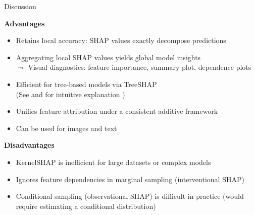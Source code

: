 \documentclass[10pt,compress,t,notes=noshow, xcolor=table]{beamer}
\begin{document}
\begin{frame}{Discussion}

\textbf{Advantages}

\begin{itemize}
    \item Retains local accuracy: SHAP values exactly decompose predictions
    \item Aggregating local SHAP values yields global model insights\\
    $\leadsto$ Visual diagnostics: feature importance, summary plot, dependence plots
    \item Efficient for tree-based models via TreeSHAP\\
    (See  and for intuitive explanation )
    \item Unifies feature attribution under a consistent additive framework
    
    \item Can be used for images   and text 
\end{itemize}

\medskip

\textbf{Disadvantages}

\begin{itemize}
  \item KernelSHAP is inefficient for large datasets or complex models
   \item Ignores feature dependencies in marginal sampling (interventional SHAP)
   \item Conditional sampling (observational SHAP) is difficult in practice (would require estimating a conditional distribution)
 
\end{itemize}


\end{frame}

\endlecture
\end{document}
